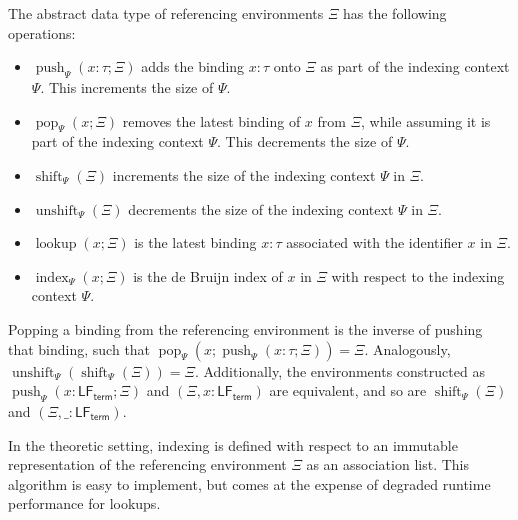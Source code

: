 \newcommand{\Hoare}[3]{\set{#1}\ #2\ \set{#3}}
\renewcommand{\Env}{\mathsf{Env}}
\renewcommand{\Pop}[3]{\operatorname{pop}_{#1}\left(#2; #3\right)}
\newcommand{\Push}[3]{\operatorname{push}_{#1}\left(#2; #3\right)}
\newcommand{\Shift}[2]{\operatorname{shift}_{#1}\left(#2\right)}
\newcommand{\Unshift}[2]{\operatorname{unshift}_{#1}\left(#2\right)}
\renewcommand{\Lookup}[2]{\operatorname{lookup}\left(#1; #2\right)}
\renewcommand{\Index}[3]{\operatorname{index}_{#1}\left(#2; #3\right)}
\newcommand{\Indexes}[3]{#1 \rightsquigarrow_{#2} #3}
\newcommand{\IndexesKind}[2]{\Indexes{#1}{{\normalfont\text{K}}}{#2}}
\newcommand{\IndexesType}[2]{\Indexes{#1}{{\normalfont\text{A}}}{#2}}
\newcommand{\IndexesTerm}[2]{\Indexes{#1}{{\normalfont\text{M}}}{#2}}
\newcommand{\LFTerm}{\mathsf{LF}_{\mathsf{term}}}
\newcommand{\LFTypeConst}{\mathsf{LF}_{\mathsf{type\ const}}}
\newcommand{\LFTermConst}{\mathsf{LF}_{\mathsf{term\ const}}}

The abstract data type of referencing environments $\Xi$ has the following operations:
\begin{itemize}
\item
$\Push{\Psi}{x : \tau}{\Xi}$ adds the binding $x : \tau$ onto $\Xi$ as part of the indexing context $\Psi$.
This increments the size of $\Psi$.
\item
$\Pop{\Psi}{x}{\Xi}$ removes the latest binding of $x$ from $\Xi$, while assuming it is part of the indexing context $\Psi$.
This decrements the size of $\Psi$.
\item
$\Shift{\Psi}{\Xi}$ increments the size of the indexing context $\Psi$ in $\Xi$.
\item
$\Unshift{\Psi}{\Xi}$ decrements the size of the indexing context $\Psi$ in $\Xi$.
\item
$\Lookup{x}{\Xi}$ is the latest binding $x : \tau$ associated with the identifier $x$ in $\Xi$.
\item
$\Index{\Psi}{x}{\Xi}$ is the de Bruijn index of $x$ in $\Xi$ with respect to the indexing context $\Psi$.
\end{itemize}
Popping a binding from the referencing environment is the inverse of pushing that binding, such that $\Pop{\Psi}{x}{\Push{\Psi}{x : \tau}{\Xi}} = \Xi$.
Analogously, $\Unshift{\Psi}{\Shift{\Psi}{\Xi}} = \Xi$.
Additionally, the environments constructed as $\Push{\Psi}{x : \LFTerm}{\Xi} $ and $ (\Xi, x : \LFTerm)$ are equivalent, and so are $\Shift{\Psi}{\Xi} $ and $ (\Xi, \_ : \LFTerm)$.

In the theoretic setting, indexing is defined with respect to an immutable representation of the referencing environment $\Xi$ as an association list.
This algorithm is easy to implement, but comes at the expense of degraded runtime performance for lookups.

